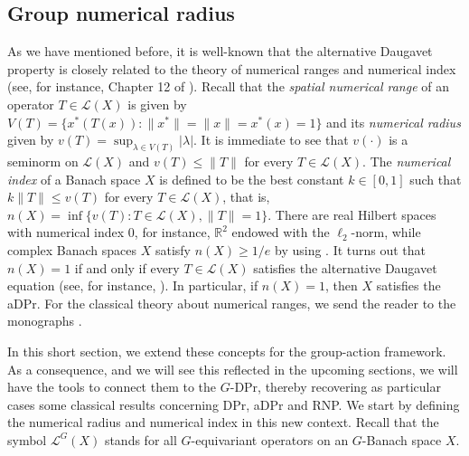 \documentclass[a4paper,12pt]{amsart}
\theoremstyle{definition}
\theoremstyle{definition}
\theoremstyle{remark}
\numberwithin{equation}{section}
\newcommand{\R}{\mathbb{R}}
\renewcommand{\geq}{\geqslant}
\renewcommand{\leq}{\leqslant}
\newcommand{\<}{\langle}
\renewcommand{\>}{\rangle}
\begin{document}
	
	\subsection{Group numerical radius} As we have mentioned before, it is well-known that the alternative Daugavet property is closely related to the theory of numerical ranges and numerical index (see, for instance, Chapter 12 of \cite{KMRW}). Recall that the {\it spatial numerical range} of an operator $T \in \mathcal{L}(X)$ is given by $V(T) = \{x^*(T(x)): \|x^*\|=\|x\|=x^*(x)=1\}$ and its {\it numerical radius} given by $v(T) = \sup_{\lambda \in V(T)} |\lambda|$. It is immediate to see that $v(\cdot)$ is a seminorm on $\mathcal{L}(X)$ and $v(T) \leq \|T\|$ for every $T \in \mathcal{L}(X)$. The {\it numerical index} of a Banach space $X$ is defined to be the best constant $k \in [0,1]$ such that $k\|T\| \leq v(T)$ for every $T \in \mathcal{L}(X)$, that is, $n(X) = \inf 
	\{v(T): T \in \mathcal{L}(X), \|T\|=1 \}$. There are real Hilbert spaces with numerical index 0, for instance, $\R^2$ endowed with the $\ell_2$-norm, while complex Banach spaces $X$ satisfy $n(X) \geq 1/e$ by using \cite[\S 4, Theorem 1]{BonsallDuncanV2}. It turns out that $n(X) = 1$ if and only if every $T \in \mathcal{L}(X)$ satisfies the alternative Daugavet equation (see, for instance, \cite[Corollary 12.3.2]{KMRW}). In particular, if $n(X) = 1$, then $X$ satisfies the aDPr. For the classical theory about numerical ranges, we send the reader to the monographs \cite{BonsallDuncanV1, BonsallDuncanV2}.
	
	
	In this short section, we extend these concepts for the group-action framework. As a consequence, and we will see this reflected in the upcoming sections, we will have the tools to connect them to the $G$-DPr, thereby recovering as particular cases some classical results concerning DPr, aDPr and RNP. We start by defining the numerical radius and numerical index in this new context. Recall that the symbol $\mathcal{L}^G(X)$ stands for all $G$-equivariant operators on an $G$-Banach space $X$.
	
\end{document}
